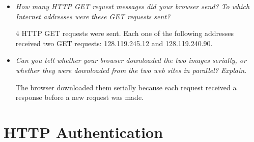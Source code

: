 \documentclass[11pt]{article}
\begin{document}
\begin{itemize}
	\setlength\itemsep{.5cm}

	\item
		\textit{How many HTTP GET request messages did your browser send? To which Internet
addresses were these GET requests sent?}
		\par 4 HTTP GET requests were sent. Each one of the following addresses received two GET requests: 128.119.245.12 and 128.119.240.90.
		
	\item
		\textit{Can you tell whether your browser downloaded the two images serially, or whether they
were downloaded from the two web sites in parallel? Explain.}
		\par The browser downloaded them serially because each request received a response before a new request was made.

\end{itemize}

\section{HTTP Authentication}
		
\end{document}
